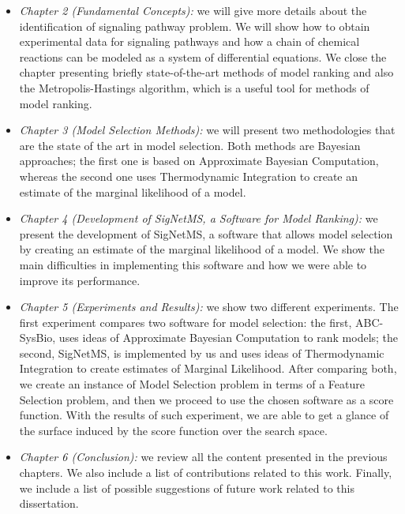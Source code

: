 \begin{itemize}
    \item{\em Chapter 2 (Fundamental Concepts):} we will give more 
        details about the identification of signaling pathway problem. 
        We will show how to obtain experimental data for signaling 
        pathways and how a chain of chemical reactions can be modeled 
        as a system  of differential equations. We close the chapter 
        presenting briefly state-of-the-art methods of model ranking and
        also the  Metropolis-Hastings algorithm, which is a useful tool
        for methods of model ranking.
    \item{\em Chapter 3 (Model Selection Methods):} we will present two
        methodologies that are the state of the art in model selection.
        Both methods are Bayesian approaches; the first one is based
        on Approximate Bayesian Computation, whereas the second one uses
        Thermodynamic Integration to create an estimate
        of the marginal likelihood of a model.
    \item{\em Chapter 4 (Development of SigNetMS, a Software for Model
        Ranking):} we present the development of SigNetMS, a software
        that allows model selection by creating an estimate of the
        marginal likelihood of a model. We show the main difficulties
        in implementing this software and how we were able to improve
        its performance.
    \item{\em Chapter 5 (Experiments and Results):} we show two 
        different experiments. The first experiment compares two 
        software for model selection: the first, ABC-SysBio, uses ideas 
        of Approximate Bayesian Computation to rank models; the second,
        SigNetMS, is implemented by us and uses ideas of Thermodynamic
        Integration to create estimates of Marginal Likelihood. After
        comparing both, we create an instance of Model Selection problem
        in terms of a Feature Selection problem, and then we proceed to
        use the chosen software as a score function. With the results of
        such experiment, we are able to get a glance of the surface
        induced by the score function over the search space.
    \item{\em Chapter 6 (Conclusion):} we review all the content
        presented in the previous chapters. We also include a list of 
        contributions related to this work. Finally, we include a list
        of possible suggestions of future work related to this
        dissertation.
\end{itemize}
